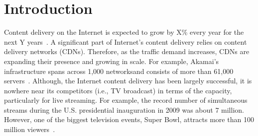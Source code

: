 \section{Introduction}

\begin{comment}
\begin{itemize}
	\item CDNs are expected to carry more traffic. 
\item Today's CDN architecture is highly distributed. With
expended capacity it is also needed to have a globally
coordinated control plane. The CDN performance will benefit
fromsuch control plane in three aspects: coordinated resource
allocation and recovery from failure and simplified
optimizationfor application goals.
\item Meanwhile, it has two fundamental challenges resulting
from its overlay nature.
	\begin{itemize}
		\item Long propagation delay
		\item Multiple controller consistency
	\end{itemize}
\item We present SDCDN that addresses the challenges by
leveraging a unique opportunity of overlay networks --
flexibility of individual node. Instead of implementing a fully
centralized control plane or pushing all control
functionalitiesto centralized controllers, our control plane
resides in both
controller, called global control process, and distributed
nodescalled local control process. The two control processes runin
different time scales.
\end{itemize}
\end{comment}


Content delivery on the Internet is expected to grow by X\%
every year for the next Y years~\cite{XX}.
A significant part of Internet's content delivery relies on
content delivery networks (CDNs).
Therefore, as the traffic demand increases, CDNs are expanding
their presence and growing in scale.
For example, Akamai's infrastructure spans across 1,000
networksand consists of more than 61,000 servers~\cite{akamai}.
Although, the Internet content delivery has been largely
successful, it is nowhere near its competitors (i.e., TV
broadcast)
in terms of the capacity, particularly for live streaming. For
example, the record number of simultaneous streams
during the U.S. presidential inauguration in 2009 was about 7
million.
However, one of the biggest television events, Super Bowl,
attracts more than 100 million viewers~\cite{XX}.

